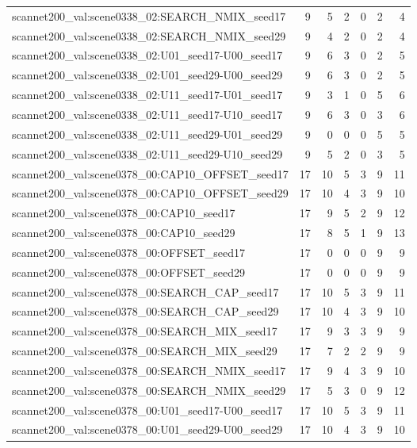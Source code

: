 \begin{table}[t]
\begin{tabular}{lrrrrrr}
scannet200\_val:scene0338\_02:SEARCH\_NMIX\_seed17 & 9 & 5 & 2 & 0 & 2 & 4 \\
scannet200\_val:scene0338\_02:SEARCH\_NMIX\_seed29 & 9 & 4 & 2 & 0 & 2 & 4 \\
scannet200\_val:scene0338\_02:U01\_seed17-U00\_seed17 & 9 & 6 & 3 & 0 & 2 & 5 \\
scannet200\_val:scene0338\_02:U01\_seed29-U00\_seed29 & 9 & 6 & 3 & 0 & 2 & 5 \\
scannet200\_val:scene0338\_02:U11\_seed17-U01\_seed17 & 9 & 3 & 1 & 0 & 5 & 6 \\
scannet200\_val:scene0338\_02:U11\_seed17-U10\_seed17 & 9 & 6 & 3 & 0 & 3 & 6 \\
scannet200\_val:scene0338\_02:U11\_seed29-U01\_seed29 & 9 & 0 & 0 & 0 & 5 & 5 \\
scannet200\_val:scene0338\_02:U11\_seed29-U10\_seed29 & 9 & 5 & 2 & 0 & 3 & 5 \\
scannet200\_val:scene0378\_00:CAP10\_OFFSET\_seed17 & 17 & 10 & 5 & 3 & 9 & 11 \\
scannet200\_val:scene0378\_00:CAP10\_OFFSET\_seed29 & 17 & 10 & 4 & 3 & 9 & 10 \\
scannet200\_val:scene0378\_00:CAP10\_seed17 & 17 & 9 & 5 & 2 & 9 & 12 \\
scannet200\_val:scene0378\_00:CAP10\_seed29 & 17 & 8 & 5 & 1 & 9 & 13 \\
scannet200\_val:scene0378\_00:OFFSET\_seed17 & 17 & 0 & 0 & 0 & 9 & 9 \\
scannet200\_val:scene0378\_00:OFFSET\_seed29 & 17 & 0 & 0 & 0 & 9 & 9 \\
scannet200\_val:scene0378\_00:SEARCH\_CAP\_seed17 & 17 & 10 & 5 & 3 & 9 & 11 \\
scannet200\_val:scene0378\_00:SEARCH\_CAP\_seed29 & 17 & 10 & 4 & 3 & 9 & 10 \\
scannet200\_val:scene0378\_00:SEARCH\_MIX\_seed17 & 17 & 9 & 3 & 3 & 9 & 9 \\
scannet200\_val:scene0378\_00:SEARCH\_MIX\_seed29 & 17 & 7 & 2 & 2 & 9 & 9 \\
scannet200\_val:scene0378\_00:SEARCH\_NMIX\_seed17 & 17 & 9 & 4 & 3 & 9 & 10 \\
scannet200\_val:scene0378\_00:SEARCH\_NMIX\_seed29 & 17 & 5 & 3 & 0 & 9 & 12 \\
scannet200\_val:scene0378\_00:U01\_seed17-U00\_seed17 & 17 & 10 & 5 & 3 & 9 & 11 \\
scannet200\_val:scene0378\_00:U01\_seed29-U00\_seed29 & 17 & 10 & 4 & 3 & 9 & 10 \\

\end{tabular}
\end{table}
